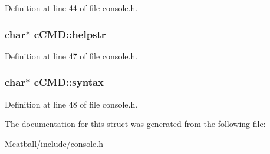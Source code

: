 Definition at line 44 of file console.\-h.

\hypertarget{structc_c_m_d_a3bf87b48a17d5153fe779c48502a3f15}{
\subsubsection[{helpstr}]{\setlength{\rightskip}{0pt plus 5cm}char$\ast$ c\-C\-M\-D\-::helpstr}}\label{structc_c_m_d_a3bf87b48a17d5153fe779c48502a3f15}


Definition at line 47 of file console.\-h.

\hypertarget{structc_c_m_d_afdf6b992caaf1b6cd0f6ede278b98797}{
\subsubsection[{syntax}]{\setlength{\rightskip}{0pt plus 5cm}char$\ast$ c\-C\-M\-D\-::syntax}}\label{structc_c_m_d_afdf6b992caaf1b6cd0f6ede278b98797}


Definition at line 48 of file console.\-h.



The documentation for this struct was generated from the following file\-:\begin{DoxyCompactItemize}
\item 
Meatball/include/\hyperlink{console_8h}{console.\-h}\end{DoxyCompactItemize}
